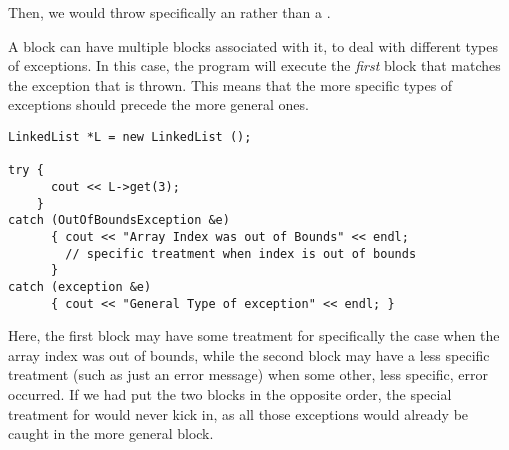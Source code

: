Then, we would throw specifically an  rather
than a .

A  block can have multiple  blocks associated
with it, to deal with different types of exceptions. 
In this case, the program will execute the \emph{first} 
block that matches the exception that is thrown.
This means that the more specific types of exceptions should precede
the more general ones.

\begin{verbatim}
LinkedList *L = new LinkedList ();

try {
      cout << L->get(3);
    }
catch (OutOfBoundsException &e)
      { cout << "Array Index was out of Bounds" << endl; 
        // specific treatment when index is out of bounds
      }
catch (exception &e)
      { cout << "General Type of exception" << endl; }
\end{verbatim}

Here, the first block may have some treatment for specifically the
case when the array index was out of bounds, while the second block
may have a less specific treatment (such as just an error message)
when some other, less specific, error occurred.
If we had put the two  blocks in the opposite order, the
special treatment for  would never kick in,
as all those exceptions would already be caught in the more general block.
